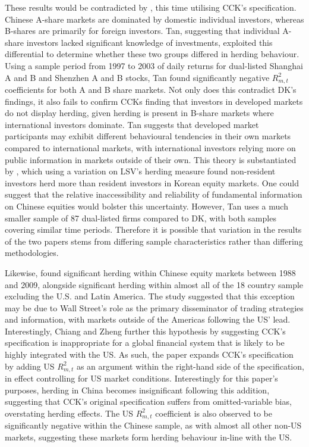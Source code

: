 \documentclass[12pt]{article}
\numberwithin{table}{section}   %
\begin{document}
These results would be contradicted by \citet{tan}, this time utilising CCK’s specification. Chinese A-share markets are dominated by domestic individual investors, whereas B-shares are primarily for foreign investors. Tan, suggesting that individual A-share investors lacked significant knowledge of investments, exploited this differential to determine whether these two groups differed in herding behaviour. Using a sample period from 1997 to 2003 of daily returns for dual-listed Shanghai A and B and Shenzhen A and B stocks, Tan found significantly negative $R_{m,t}^2$ coefficients for both A and B share markets. Not only does this contradict DK’s findings, it also fails to confirm CCKs finding that investors in developed markets do not display herding, given herding is present in B-share markets where international investors dominate. Tan suggests that developed market participants may exhibit different behavioural tendencies in their own markets compared to international markets, with international investors relying more on public information in markets outside of their own. This theory is substantiated by \citet{kim}, which using a variation on LSV’s herding measure found non-resident investors herd more than resident investors in Korean equity markets. One could suggest that the relative inaccessibility and reliability of fundamental information on Chinese equities would bolster this uncertainty. However, Tan uses a much smaller sample of 87 dual-listed firms compared to DK, with both samples covering similar time periods. Therefore it is possible that variation in the results of the two papers stems from differing sample characteristics rather than differing methodologies.

Likewise, \citet{chiangzheng} found significant herding within Chinese equity markets between 1988 and 2009, alongside significant herding within almost all of the 18 country sample excluding the U.S. and Latin America. The study suggested that this exception may be due to Wall Street’s role as the primary disseminator of trading strategies and information, with markets outside of the Americas following the US’ lead. Interestingly, Chiang and Zheng further this hypothesis by suggesting CCK’s specification is inappropriate for a global financial system that is likely to be highly integrated with the US. As such, the paper expands CCK’s specification by adding US $R_{m,t}^2$ as an argument within the right-hand side of the specification, in effect controlling for US market conditions. Interestingly for this paper’s purposes, herding in China becomes insignificant following this addition, suggesting that CCK’s original specification suffers from omitted-variable bias, overstating herding effects. The US $R_{m,t}^2$ coefficient is also observed to be significantly negative within the Chinese sample, as with almost all other non-US markets, suggesting these markets form herding behaviour in-line with the US.
\end{document}
